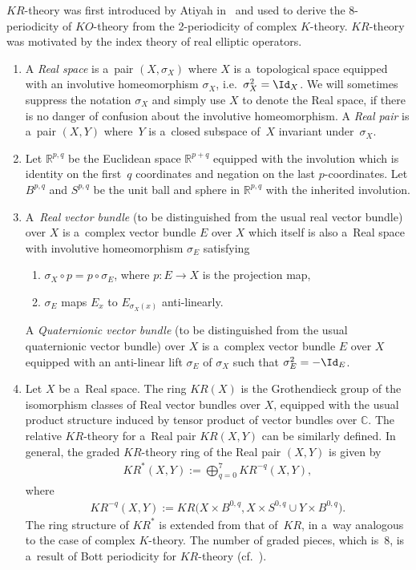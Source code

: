 $KR$-theory was f\/irst introduced by Atiyah in~\cite{At3} and used to derive the 8-periodicity of $KO$-theory from the
2-periodicity of complex $K$-theory.
$KR$-theory was motivated by the index theory of real elliptic operators.
\begin{Definition}\label{krtheory}\quad
\begin{enumerate}\itemsep=0pt
\item
A \emph{Real space} is a~pair $(X,
\sigma_X)$ where $X$ is a~topological space equipped with an involutive homeomorphism $\sigma_X$, i.e.\
$\sigma_X^2=\Id
_X$.
We will sometimes suppress the notation $\sigma_X$ and simply use $X$ to denote the Real space,
if there is no danger of confusion about the involutive
homeomorphism.
A \emph{Real pair}
is a~pair $(X, Y)$ where~$Y$ is a~closed subspace of~$X$ invariant under~$\sigma_X$.
\item
Let $\mathbb{R}^{p, q}$ be the Euclidean space $\mathbb{R}^{p+q}$
equipped with the involution which is identity on the f\/irst~$q$
coordinates and negation on the last $p$-coordinates.
Let $B^{p, q}$ and $S^{p, q}$ be the unit ball and sphere in $\mathbb{R}^{p, q}$ with the inherited involution.
\item
A~\emph{Real vector bundle}
(to be distinguished from the usual real vector bundle) over $X$ is a~complex vector bundle
$E$ over $X$ which itself is also a~Real space with involutive homeomorphism $\sigma_E$ satisfying
\begin{enumerate}\itemsep=0pt
\item
$\sigma_X\circ p=p\circ\sigma_E$, where $p: E\to X$ is the projection map,
\item
$\sigma_E$ maps $E_x$ to $E_{\sigma_X(x)}$ anti-linearly.
\end{enumerate}
A \emph{Quaternionic vector bundle}
(to be distinguished from the usual quaternionic vector bundle) over $X$ is a~complex
vector bundle $E$ over $X$ equipped with an anti-linear lift $\sigma_E$ of $\sigma_X$ such that $\sigma_E^2=-\Id
_E$.
\item
Let $X$ be a~Real space.
The ring $KR(X)$ is the Grothendieck group of the isomorphism classes of Real vector bundles over $X$, equipped with the
usual product structure induced by tensor product of vector bundles over $\mathbb{C}$.
The relative $KR$-theory for a~Real pair $KR(X, Y)$ can be similarly def\/ined.
In general, the graded $KR$-theory ring of the Real pair $(X, Y)$ is given by
\begin{gather*}
KR^*(X, Y):=\bigoplus_{q=0}^7 KR^{-q}(X, Y),
\end{gather*}
where
\begin{gather*}
KR^{-q}(X, Y):=KR\big(X\times B^{0,q}, X\times S^{0, q}\cup Y\times B^{0,q}\big).
\end{gather*}
The ring structure of $KR^*$ is extended from that of~$KR$, in a~way analogous to the case of complex $K$-theory.
The number of graded pieces, which is~8, is a~result of Bott periodicity for $KR$-theory (cf.~\cite{At3}).
\end{enumerate}
\end{Definition}

